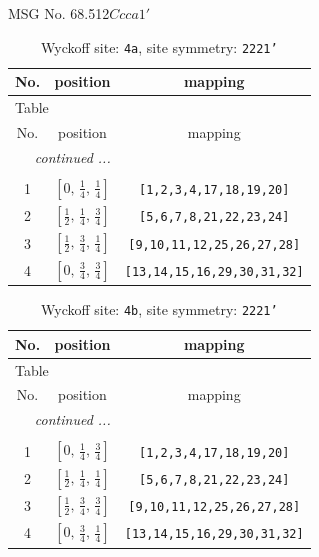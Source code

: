 \documentclass[fleqn,8pt]{jsarticle}
\begin{document}
\setcounter{MaxMatrixCols}{32}

\renewcommand{\tablename}{Table~}
\renewcommand{\figurename}{Figure~}
\begin{center}
\LARGE
MSG No. 68.512\quad$Ccca1'$
\end{center}
\renewcommand{\arraystretch}{1.2}
\begin{longtable}{ccc}
\caption{Wyckoff site: {\tt 4a}, site symmetry: {\tt 2221'}}
 \\
 \hline \hline
No. & position & mapping \\ \hline \endfirsthead

\multicolumn{2}{l}{\tablename\ \thetable{}} \\
 \hline \hline
No. & position & mapping \\ \hline \endhead

 \hline \hline
\multicolumn{2}{r}{\footnotesize\it continued ...} \\ \endfoot

 \hline \hline
\multicolumn{2}{r}{} \\ \endlastfoot

1 & $\left[ 0,\, \frac{1}{4},\, \frac{1}{4} \right]$ & {\tt [1,2,3,4,17,18,19,20]} \\ \hline
2 & $\left[ \frac{1}{2},\, \frac{1}{4},\, \frac{3}{4} \right]$ & {\tt [5,6,7,8,21,22,23,24]} \\ \hline
3 & $\left[ \frac{1}{2},\, \frac{3}{4},\, \frac{1}{4} \right]$ & {\tt [9,10,11,12,25,26,27,28]} \\ \hline
4 & $\left[ 0,\, \frac{3}{4},\, \frac{3}{4} \right]$ & {\tt [13,14,15,16,29,30,31,32]} \\
\end{longtable}
\renewcommand{\arraystretch}{1.2}
\begin{longtable}{ccc}
\caption{Wyckoff site: {\tt 4b}, site symmetry: {\tt 2221'}}
 \\
 \hline \hline
No. & position & mapping \\ \hline \endfirsthead

\multicolumn{2}{l}{\tablename\ \thetable{}} \\
 \hline \hline
No. & position & mapping \\ \hline \endhead

 \hline \hline
\multicolumn{2}{r}{\footnotesize\it continued ...} \\ \endfoot

 \hline \hline
\multicolumn{2}{r}{} \\ \endlastfoot

1 & $\left[ 0,\, \frac{1}{4},\, \frac{3}{4} \right]$ & {\tt [1,2,3,4,17,18,19,20]} \\ \hline
2 & $\left[ \frac{1}{2},\, \frac{1}{4},\, \frac{1}{4} \right]$ & {\tt [5,6,7,8,21,22,23,24]} \\ \hline
3 & $\left[ \frac{1}{2},\, \frac{3}{4},\, \frac{3}{4} \right]$ & {\tt [9,10,11,12,25,26,27,28]} \\ \hline
4 & $\left[ 0,\, \frac{3}{4},\, \frac{1}{4} \right]$ & {\tt [13,14,15,16,29,30,31,32]} \\
\end{longtable}
\end{document}
